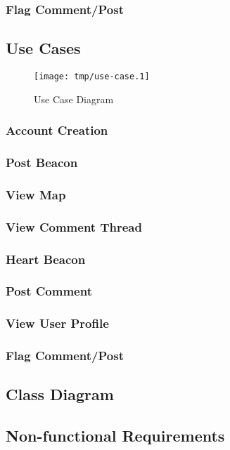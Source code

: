         \subsubsection{Flag Comment/Post}

    \subsection{Use Cases}
        \begin{figure}[h]
            \centering
            \texttt{[image: tmp/use-case.1]} 
            \caption{Use Case Diagram}
        \end{figure}

        \subsubsection{Account Creation}
        \subsubsection{Post Beacon}
        \subsubsection{View Map}
        \subsubsection{View Comment Thread}
        \subsubsection{Heart Beacon}
        \subsubsection{Post Comment}
        \subsubsection{View User Profile}
        \subsubsection{Flag Comment/Post}


    \subsection{Class Diagram}

    \subsection{Non-functional Requirements}

